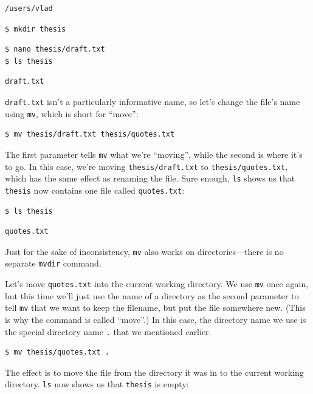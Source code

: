 \documentclass{book}
\begin{document}
\begin{verbatim}
/users/vlad
\end{verbatim}

\begin{verbatim}
$ mkdir thesis
\end{verbatim}

\begin{verbatim}
$ nano thesis/draft.txt
$ ls thesis
\end{verbatim}

\begin{verbatim}
draft.txt
\end{verbatim}

\texttt{draft.txt} isn't a particularly informative name, so let's
change the file's name using \texttt{mv}, which is short for ``move'':

\begin{verbatim}
$ mv thesis/draft.txt thesis/quotes.txt
\end{verbatim}

The first parameter tells \texttt{mv} what we're ``moving'', while the
second is where it's to go. In this case, we're moving
\texttt{thesis/draft.txt} to \texttt{thesis/quotes.txt}, which has the
same effect as renaming the file. Sure enough, \texttt{ls} shows us that
\texttt{thesis} now contains one file called \texttt{quotes.txt}:

\begin{verbatim}
$ ls thesis
\end{verbatim}

\begin{verbatim}
quotes.txt
\end{verbatim}

Just for the sake of inconsistency, \texttt{mv} also works on
directories---there is no separate \texttt{mvdir} command.

Let's move \texttt{quotes.txt} into the current working directory. We
use \texttt{mv} once again, but this time we'll just use the name of a
directory as the second parameter to tell \texttt{mv} that we want to
keep the filename, but put the file somewhere new. (This is why the
command is called ``move''.) In this case, the directory name we use is
the special directory name \texttt{.} that we mentioned earlier.

\begin{verbatim}
$ mv thesis/quotes.txt .
\end{verbatim}

The effect is to move the file from the directory it was in to the
current working directory. \texttt{ls} now shows us that \texttt{thesis}
is empty:
\end{document}
